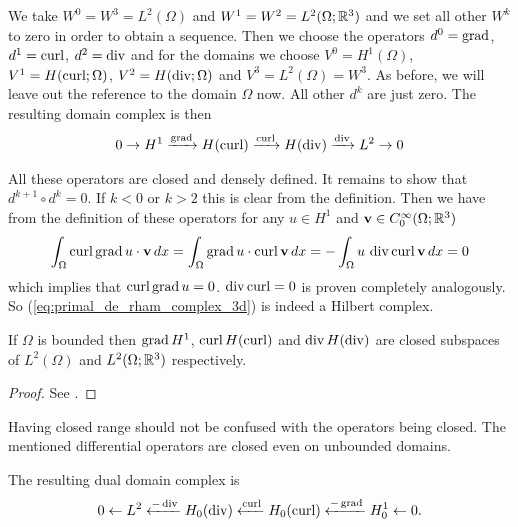 \documentclass[../main.tex]{subfiles}
\begin{document}
We take $W^0 = W^3 = L^2(\Omega)$ and $W^1 = W^2 = L^2(\Omega;\mathbb{R}^3)$ 
and we set all other $W^k$ to zero in order to obtain a sequence.
Then we choose the operators $d^0 = \operatorname{grad}$, $d^1 = \operatorname{curl}$, $d^2 = \operatorname{div}$ and
for the domains we choose $V^0 = H^1(\Omega)$, $V^1 = H(\operatorname{curl};\Omega)$, 
$V^2 = H(\operatorname{div};\Omega)$ and $V^3 = L^2(\Omega) = W^3$. 
As before, we will leave out the reference to the domain $\Omega$ now.
All other 
$d^k$ are just zero. The resulting domain complex is then
\begin{align}
    0 \rightarrow H^1 \xrightarrow{\operatorname{grad}} H(\operatorname{curl})
        \xrightarrow{\operatorname{curl}} H(\operatorname{div}) \xrightarrow{\operatorname{div}} L^2 \rightarrow 0
    \label{eq:primal_de_rham_complex_3d}
\end{align}

All these operators are closed and densely defined. It remains to show that 
$d^{k+1} \circ d^k = 0$. If $k < 0$ or $k>2$ this is clear from the definition. 
Then we have from the definition of these operators 
for any $u \in H^1$ and $\mathbf{v} \in C^\infty_0(\Omega;\mathbb{R}^3)$  
\begin{align*}
    \int_\Omega \operatorname{curl} \operatorname{grad} u \cdot \mathbf{v} \, dx 
    = \int_\Omega \operatorname{grad} u \cdot \operatorname{curl} \mathbf{v} \, dx 
    = -\int_\Omega u \, \operatorname{div} \operatorname{curl} \mathbf{v} \, dx
    = 0
\end{align*}
which implies that $\operatorname{curl} \operatorname{grad} u = 0$. $\operatorname{div} \operatorname{curl} = 0$ is proven 
completely analogously. So (\ref{eq:primal_de_rham_complex_3d}) is indeed a 
Hilbert complex. 

\begin{theorem}\label{thm:closed_range}
    If $\Omega$ is bounded then $\operatorname{grad} H^1$, $\operatorname{curl} H(\operatorname{curl})$ and 
    $\operatorname{div} H(\operatorname{div})$ are closed subspaces of $L^2(\Omega)$ and 
    $L^2(\Omega;\mathbb{R}^3)$ respectively.
\end{theorem}
\begin{proof}
    See \cite[p.38]{arnold}.
\end{proof}
Having closed range should not be confused with the operators being closed.
The mentioned differential operators are closed even on unbounded domains.

The resulting dual domain complex is 
\begin{align*}
    0 \leftarrow L^2 \xleftarrow{-\operatorname{div}} H_0(\operatorname{div})
        \xleftarrow{\operatorname{curl}} H_0(\operatorname{curl}) 
        \xleftarrow{-\operatorname{grad}} H^1_0 \leftarrow 0.
\end{align*}
\end{document}
